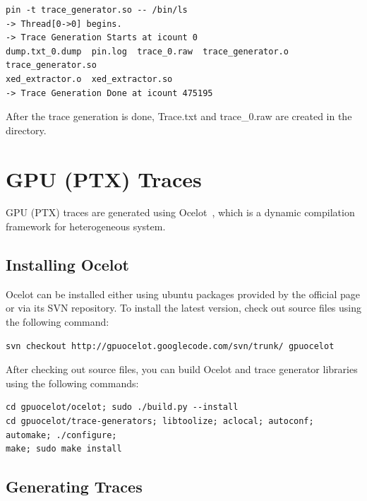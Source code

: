 \begin{Verbatim}
pin -t trace_generator.so -- /bin/ls
-> Thread[0->0] begins.
-> Trace Generation Starts at icount 0
dump.txt_0.dump  pin.log  trace_0.raw  trace_generator.o  trace_generator.so  
xed_extractor.o  xed_extractor.so
-> Trace Generation Done at icount 475195
\end{Verbatim}


After the trace generation is done, Trace.txt and trace\_0.raw are created in the directory.


\section{GPU (PTX) Traces}
\label{sec:gpu_traces}

GPU (PTX) traces are generated using Ocelot~\cite{ocelot}, which is a dynamic compilation
framework for heterogeneous system. 


\subsection{Installing Ocelot}

Ocelot can be installed either using ubuntu packages provided by the official
page or via its SVN repository. To install the latest version, check out 
source files using the following command:


\begin{Verbatim}
svn checkout http://gpuocelot.googlecode.com/svn/trunk/ gpuocelot
\end{Verbatim}


After checking out source files, you can build Ocelot and trace generator libraries using the following commands:


\begin{Verbatim}
cd gpuocelot/ocelot; sudo ./build.py --install
cd gpuocelot/trace-generators; libtoolize; aclocal; autoconf; automake; ./configure; 
make; sudo make install
\end{Verbatim}


\subsection{Generating Traces}

